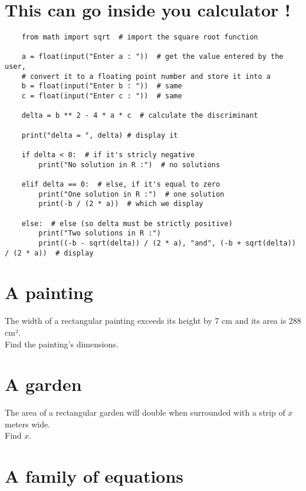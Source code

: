 \documentclass[12pt,a4paper,article,english,firamath]{nsi}
\begin{document}
\maketitle

\section*{This can go inside you calculator !}
\begin{pyc}
    \begin{verbatim}
    from math import sqrt  # import the square root function

    a = float(input("Enter a : "))  # get the value entered by the user,
    # convert it to a floating point number and store it into a
    b = float(input("Enter b : "))  # same
    c = float(input("Enter c : "))  # same

    delta = b ** 2 - 4 * a * c  # calculate the discriminant
    
    print("delta = ", delta) # display it

    if delta < 0:  # if it's stricly negative
        print("No solution in R :")  # no solutions

    elif delta == 0:  # else, if it's equal to zero
        print("One solution in R :")  # one solution
        print(-b / (2 * a))  # which we display

    else:  # else (so delta must be strictly positive)
        print("Two solutions in R :")
        print((-b - sqrt(delta)) / (2 * a), "and", (-b + sqrt(delta)) / (2 * a))  # display
    \end{verbatim}
\end{pyc}
\section*{A painting}
The width of a rectangular painting exceeds its height by 7 cm and its area is 288 cm².\\
Find the painting's dimensions.

\section*{A garden}
The area of a rectangular garden will double when surrounded with a strip of $x$ meters wide.\\

Find $x$.
\newpage
\section*{A family of equations}
\end{document}
